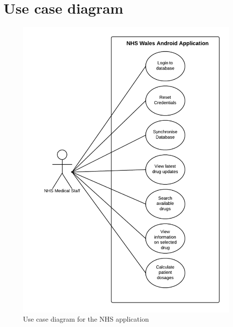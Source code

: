 \documentclass[11pt,fleqn,twoside]{article}
\begin{document}
\section{Use case diagram}
\begin{figure}[H]
\centering
\includegraphics[width=4.4in]{useCase}
\caption{Use case diagram for the NHS application}
\end{figure}
\end{document}
